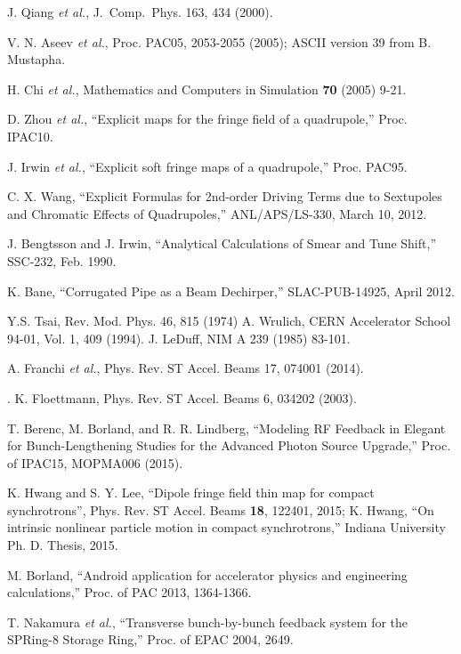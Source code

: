 \documentclass[11pt]{article}
\begin{document}
\begin{thebibliography}{9}
J. Qiang {\em et al.},  J.~Comp.~Phys. 163, 434 (2000).

  V. N. Aseev {\em et al.}, Proc. PAC05, 2053-2055 (2005); ASCII version 39 from B. Mustapha.

  H. Chi {\em et al.}, Mathematics and Computers in Simulation {\bf 70} (2005) 9-21.

  D. Zhou {\em et al.}, ``Explicit maps for the fringe field of a quadrupole,'' Proc. IPAC10.

  J. Irwin {\em et al.}, ``Explicit soft fringe maps of a quadrupole,'' Proc. PAC95.

  C. X. Wang, ``Explicit Formulas for 2nd-order Driving Terms due to Sextupoles and Chromatic Effects of Quadrupoles,''
  ANL/APS/LS-330, March 10, 2012.

  J. Bengtsson and J. Irwin, ``Analytical Calculations of Smear and Tune Shift,'' SSC-232, Feb. 1990.

 K. Bane, ``Corrugated Pipe as a Beam Dechirper,'' SLAC-PUB-14925, April 2012.

 Y.S. Tsai, Rev. Mod. Phys. 46, 815 (1974)
 A. Wrulich, CERN Accelerator School 94-01, Vol. 1, 409 (1994).
 J. LeDuff, NIM A 239 (1985) 83-101.

 A. Franchi {\em et al.}, Phys. Rev. ST Accel. Beams 17, 074001 (2014).

.
 K. Floettmann, Phys. Rev. ST Accel. Beams 6, 034202 (2003).

 T. Berenc, M. Borland, and R. R. Lindberg, ``Modeling RF Feedback in Elegant for Bunch-Lengthening Studies for the Advanced Photon Source Upgrade,''
 Proc. of IPAC15, MOPMA006 (2015).

  K. Hwang and S. Y. Lee, ``Dipole fringe field thin map for compact synchrotrons'', Phys. Rev. ST Accel. Beams {\bf 18}, 122401, 2015; K. Hwang, ``On intrinsic nonlinear particle 
  motion in compact synchrotrons,'' Indiana University Ph. D. Thesis, 2015.

  M. Borland, ``Android application for accelerator physics and engineering calculations,'' Proc. of PAC 2013, 1364-1366.

  T. Nakamura {\em et al.}, ``Transverse bunch-by-bunch feedback system for the SPRing-8 Storage Ring,'' Proc. of EPAC 2004, 2649.


\end{thebibliography}
\end{document}
